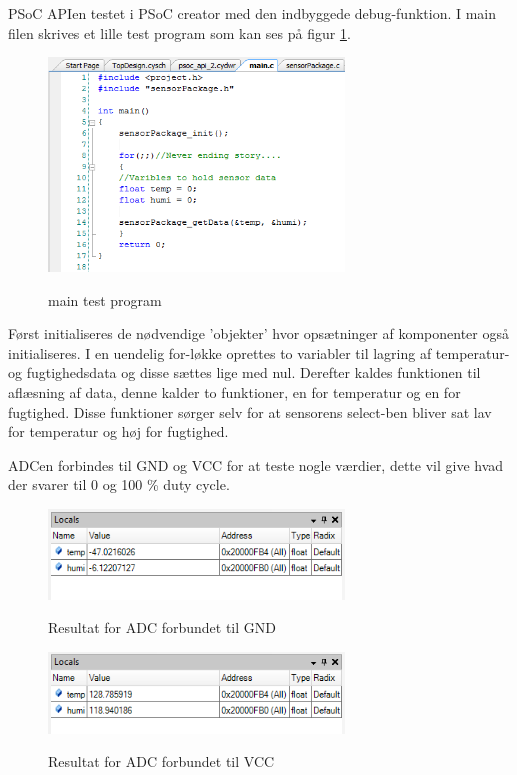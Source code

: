 
PSoC APIen testet i PSoC creator med den indbyggede debug-funktion. I main filen skrives et lille test program som kan ses på figur \ref{lab:sht_testmain}.

\begin{figure}[htb]
\centering
{\includegraphics[width=0.70\textwidth]{filer/modultest/Billeder/psoc_testmain.png}}
\caption{main test program}
\label{lab:sht_testmain}
\end{figure}

Først initialiseres de nødvendige 'objekter' hvor opsætninger af komponenter også initialiseres. I en uendelig for-løkke oprettes to variabler til lagring af temperatur- og fugtighedsdata og disse sættes lige med nul. Derefter kaldes funktionen til aflæsning af data, denne kalder to funktioner, en for temperatur og en for fugtighed. Disse funktioner sørger selv for at sensorens select-ben bliver sat lav for temperatur og høj for fugtighed. 

ADCen forbindes til GND og VCC for at teste nogle værdier, dette vil give hvad der svarer til 0 og 100 \% duty cycle. 
  
\begin{figure}[htb]
\centering
{\includegraphics[width=0.70\textwidth]{filer/modultest/Billeder/psoc_api_test1.png}}
\caption{Resultat for ADC forbundet til GND}
\label{lab:sht_api_test1}
\end{figure}

\begin{figure}[htb]
\centering
{\includegraphics[width=0.70\textwidth]{filer/modultest/Billeder/psoc_api_test2.png}}
\caption{Resultat for ADC forbundet til VCC}
\label{lab:sht_api_test2}
\end{figure}

